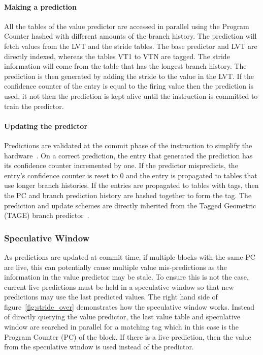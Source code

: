 \paragraph*{Making a prediction}
All the tables of the value predictor are accessed in parallel using the Program Counter hashed with different amounts of the branch history.
The prediction will fetch values from the LVT and the stride tables.
The base predictor and LVT are directly indexed, whereas the tables VT1 to VTN are tagged.
The stride information will come from the table that has the longest branch history.
The prediction is then generated by adding the stride to the value in the LVT.
If the confidence counter of the entry is equal to the firing value then the prediction is used, it not then the prediction is kept alive until the instruction is committed to train the predictor.

\paragraph*{Updating the predictor}
Predictions are validated at the commit phase of the instruction to simplify the hardware~\cite{peraisVTAGE2014}.
On a correct prediction, the entry that generated the prediction has its confidence counter incremented by one.
If the predictor mispredicts, the entry's confidence counter is reset to 0 and the entry is propagated to tables that use longer branch histories.
If the entries are propagated to tables with tags, then the PC and branch prediction history are hashed together to form the tag.
The prediction and update schemes are directly inherited from the Tagged Geometric (TAGE) branch predictor~\cite{SeznecITTAGE}.

\subsubsection{Speculative Window}
As predictions are updated at commit time, if multiple blocks with the same PC are live, this can potentially cause multiple value mis-predictions as the information in the value predictor may be stale.
To ensure this is not the case, current live predictions must be held in a speculative window so that new predictions may use the last predicted values.
The right hand side of figure~\ref{fig:stride_over} demonstrates how the speculative window works. 
Instead of directly querying the value predictor, the last value table and speculative window are searched in parallel for a matching tag which in this case is the Program Counter (PC) of the block.
If there is a live prediction, then the value from the speculative window is used instead of the predictor.

